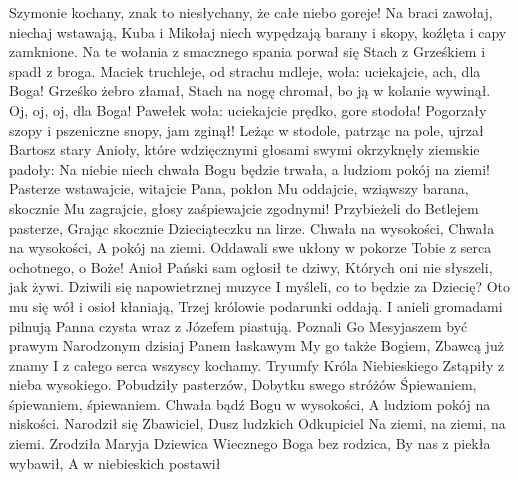 Szymonie kochany, znak to niesłychany,
że całe niebo goreje!
Na braci zawołaj, niechaj wstawają,
Kuba i Mikołaj niech wypędzają
barany i skopy, koźlęta i capy zamknione.
\endchorus
\beginverse
Na te wołania z smacznego spania
porwał się Stach z Grześkiem i spadł z broga.
Maciek truchleje, od strachu mdleje,
woła: uciekajcie, ach, dla Boga!
\endverse
\beginchorus
Grześko żebro złamał, Stach na nogę chromał,
bo ją w kolanie wywinął.
Oj, oj, oj, dla Boga! Pawełek woła:
uciekajcie prędko, gore stodoła!
Pogorzały szopy i pszeniczne snopy, jam zginął!
\endchorus
\beginverse
Leżąc w stodole, patrząc na pole,
ujrzał Bartosz stary Anioły,
które wdzięcznymi głosami swymi
okrzyknęły ziemskie padoły:
\endverse
\beginchorus
Na niebie niech chwała Bogu będzie trwała,
a ludziom pokój na ziemi!
Pasterze wstawajcie, witajcie Pana,
pokłon Mu oddajcie, wziąwszy barana,
skocznie Mu zagrajcie, głosy zaśpiewajcie zgodnymi!
\endchorus
\endsong
\beginverse
    Przybieżeli do Betlejem pasterze,
    Grając skocznie Dzieciąteczku na lirze.
\endverse
\beginchorus
	Chwała na wysokości,
	Chwała na wysokości,
	A pokój na ziemi.
\endchorus
\beginverse
    Oddawali swe ukłony w pokorze
    Tobie z serca ochotnego, o Boże!
\endverse
\beginverse
    Anioł Pański sam ogłosił te dziwy,
    Których oni nie słyszeli, jak żywi.
\endverse
\beginverse
    Dziwili się napowietrznej muzyce
    I myśleli, co to będzie za Dziecię?
\endverse
\beginverse
    Oto mu się wół i osioł kłaniają,
    Trzej królowie podarunki oddają.
\endverse
\beginverse
    I anieli gromadami pilnują
    Panna czysta wraz z Józefem piastują.
\endverse
\beginverse
    Poznali Go Mesyjaszem być prawym
    Narodzonym dzisiaj Panem łaskawym
\endverse
\beginverse
    My go także Bogiem, Zbawcą już znamy
    I z całego serca wszyscy kochamy.
\endverse
\endsong
\beginverse
    Tryumfy Króla Niebieskiego
    Zstąpiły z nieba wysokiego.
\endverse
\beginchorus
    Pobudziły pasterzów,
    Dobytku swego stróżów
    Śpiewaniem, śpiewaniem, śpiewaniem.
\endchorus
\beginverse
    Chwała bądź Bogu w wysokości,
    A ludziom pokój na niskości.
\endverse
\beginchorus
    Narodził się Zbawiciel,
    Dusz ludzkich Odkupiciel
    Na ziemi, na ziemi, na ziemi.
\endchorus
\beginverse
    Zrodziła Maryja Dziewica
    Wiecznego Boga bez rodzica,
\endverse
\beginchorus
    By nas z piekła wybawił,
    A w niebieskich postawił
